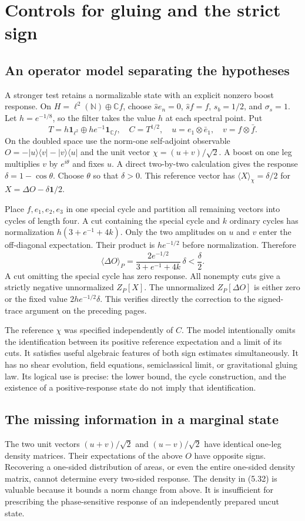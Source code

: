 \documentclass[11pt]{article}
\newcommand{\id}{\mathbf{1}}
\newcommand{\areaop}{\hat s}
\newcommand{\parttitle}[2]{\clearpage\section{#1}\markboth{#2}{#2}}
\begin{document}
\parttitle{Controls for gluing and the strict sign}{Controls for gluing}
\subsection{An operator model separating the hypotheses}
A stronger test retains a normalizable state with an explicit nonzero boost response. On $H=\ell^2(\mathbb N)\oplus\mathbb C f$, choose $\areaop e_n=0$, $\areaop f=f$, $s_b=1/2$, and $\sigma_s=1$. Let $h=e^{-1/8}$, so the filter takes the value $h$ at each spectral point. Put
\[
 T=h\id_{\ell^2}\oplus he^{-1}\id_{\mathbb Cf},\quad C=T^{1/2},
 \quad u=e_1\otimes\bar e_1,\quad v=f\otimes\bar f .
\]
On the doubled space use the norm-one self-adjoint observable $O=-|u\rangle\langle v|-|v\rangle\langle u|$ and the unit vector $\chi=(u+v)/\sqrt{2}$. A boost on one leg multiplies $v$ by $e^{i\theta}$ and fixes $u$. A direct two-by-two calculation gives the response $\delta=1-\cos\theta$. Choose $\theta$ so that $\delta>0$. This reference vector has $\langle X\rangle_\chi=\delta/2$ for $X=\Delta O-\delta\id/2$.

Place $f,e_1,e_2,e_3$ in one special cycle and partition all remaining vectors into cycles of length four. A cut containing the special cycle and $k$ ordinary cycles has normalization $h(3+e^{-1}+4k)$. Only the two amplitudes on $u$ and $v$ enter the off-diagonal expectation. Their product is $he^{-1/2}$ before normalization. Therefore
\[
 \langle\Delta O\rangle_P
 =\frac{2e^{-1/2}}{3+e^{-1}+4k}\,\delta<\frac{\delta}{2}.
\]
A cut omitting the special cycle has zero response. All nonempty cuts give a strictly negative unnormalized $Z_P[X]$. The unnormalized $Z_P[\Delta O]$ is either zero or the fixed value $2he^{-1/2}\delta$. This verifies directly the correction to the signed-trace argument on the preceding pages.

The reference $\chi$ was specified independently of $C$. The model intentionally omits the identification between its positive reference expectation and a limit of its cuts. It satisfies useful algebraic features of both sign estimates simultaneously. It has no shear evolution, field equations, semiclassical limit, or gravitational gluing law. Its logical use is precise: the lower bound, the cycle construction, and the existence of a positive-response state do not imply that identification.

\subsection{The missing information in a marginal state}
The two unit vectors $(u+v)/\sqrt2$ and $(u-v)/\sqrt2$ have identical one-leg density matrices. Their expectations of the above $O$ have opposite signs. Recovering a one-sided distribution of areas, or even the entire one-sided density matrix, cannot determine every two-sided response. The density in (5.32) is valuable because it bounds a norm change from above. It is insufficient for prescribing the phase-sensitive response of an independently prepared uncut state.
\end{document}

